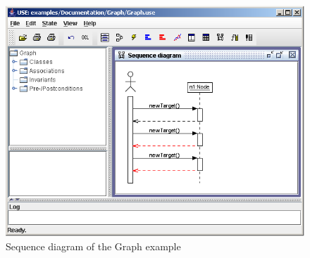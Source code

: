 \documentclass[a4paper,titlepage,oneside,final]{scrreprt} %
\begin{document}
\begin{figure}[ht]
\centering
\includegraphics[scale=0.7]{Screenshots/GUI/GraphSequence.png}
\caption{Sequence diagram of the Graph example}
\label{fig:GraphSequence}
\end{figure}
\end{document}
